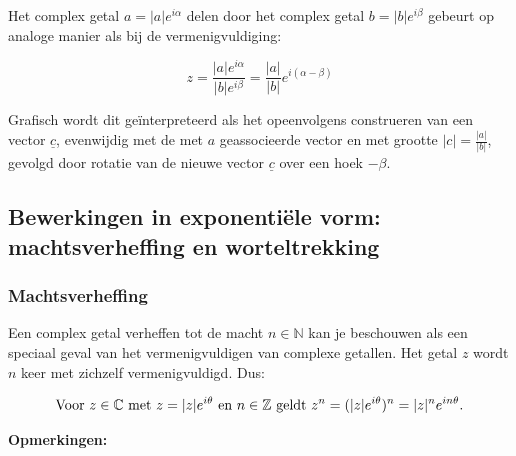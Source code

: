 Het complex getal $a=|a|e^{i\alpha}$ delen door het complex getal $b=|b|e^{i\beta}$ gebeurt op analoge manier als bij de vermenigvuldiging:\\

\begin{framed}
	\[ z=\frac{|a|e^{i\alpha}}{|b|e^{i\beta}}=\frac{|a|}{|b|}e^{i (\alpha - \beta)}  \]
\end{framed}

Grafisch wordt dit ge\"{i}nterpreteerd als het opeenvolgens construeren van een vector $\underline{c}$, evenwijdig met de met $a$ geassocieerde vector en met grootte $|c|=\frac{|a|}{|b|}$, gevolgd door rotatie van de nieuwe vector $\underline{c}$ over een hoek $-\beta$.\\

\subsection{Bewerkingen in exponenti\"{e}le vorm: machtsverheffing en worteltrekking}

\subsubsection{Machtsverheffing}

Een complex getal verheffen tot de macht $n \in \mathbb{N}$ kan je beschouwen als een speciaal geval van het vermenigvuldigen van complexe getallen. Het getal $z$ wordt $n$ keer met zichzelf vermenigvuldigd. Dus:\\

\begin{framed}
\begin{equation*}
\text{Voor } z \in \mathbb{C} \text{ met } z = |z|e^{i\theta} \text{ en } n \in \mathbb{Z} \text{ geldt } \\
z^n = (|z|e^{i \theta})^n = |z|^n e^{i n \theta}.
\end{equation*}
\end{framed}
%
%
%

{\bf Opmerkingen: }\\

